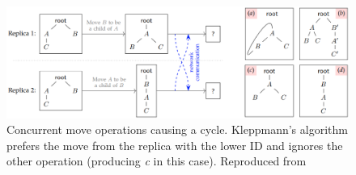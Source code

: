 \documentclass[12pt]{report}
\begin{document}
\begin{itemize}
          \begin{figure}
            \centering
            \includegraphics[width=1\textwidth]{images/kleppmann.png}
            \caption{Concurrent move operations causing a cycle. Kleppmann's algorithm prefers the move from the replica with the lower ID and ignores the other operation (producing \textit{c} in this case). Reproduced from \cite{9563274}}
            \label{fig:kleppmann}
        \end{figure}
          


\end{itemize}
\end{document}
